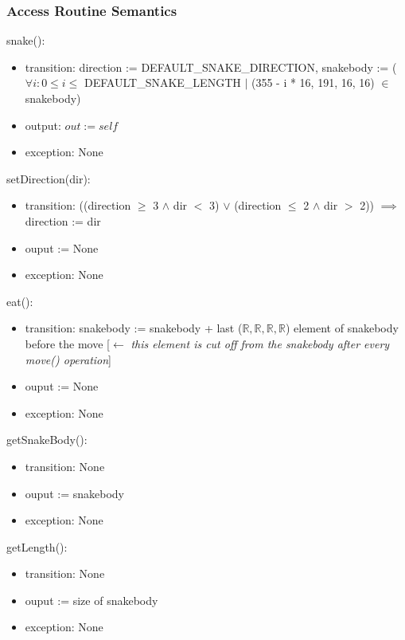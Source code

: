 \documentclass[12pt, titlepage]{article}
\begin{document}
\subsubsection* {Access Routine Semantics}

snake():
\begin{itemize}
\item transition: direction := DEFAULT\_SNAKE\_DIRECTION, snakebody := ($\forall i : 0 \leq i \leq$ DEFAULT\_SNAKE\_LENGTH $|$ (355 - i * 16, 191, 16, 16) $\in$ snakebody)
\item output: $\mathit{out} := \mathit{self}$
\item exception: None
\end{itemize}

\noindent setDirection(dir):
\begin{itemize}
\item transition: ((direction $\geq$ 3 $\land$ dir $<$ 3) $\lor$ (direction $\leq$ 2 $\land$ dir $>$ 2)) $\implies$ direction := dir
\item ouput := None
\item exception: None\\
\end{itemize}

\noindent eat():
\begin{itemize}
\item transition: snakebody := snakebody + last ($\mathbb{R}, \mathbb{R}, \mathbb{R}, \mathbb{R}$) element of snakebody before the move [$\leftarrow$ \textit{this element is cut off from the snakebody after every move() operation}]
\item ouput := None
\item exception: None\\
\end{itemize}

\noindent getSnakeBody():
\begin{itemize}
\item transition: None
\item ouput := snakebody
\item exception: None\\
\end{itemize}

\noindent getLength():
\begin{itemize}
\item transition: None
\item ouput := size of snakebody
\item exception: None\\
\end{itemize}
\end{document}
